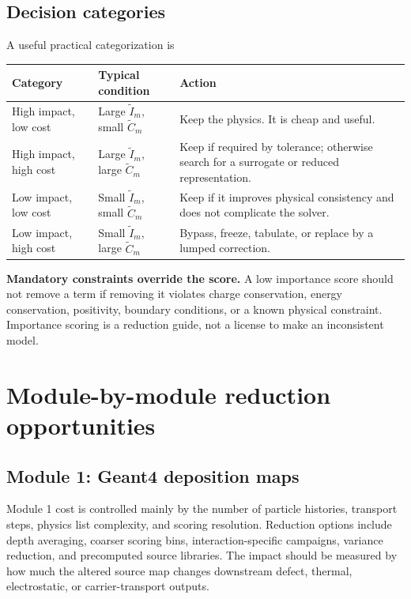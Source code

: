 \documentclass[11pt]{article}
\begin{document}
\subsection{Decision categories}
A useful practical categorization is
\begin{center}
\begin{tabularx}{0.95\textwidth}{>{\RaggedRight\arraybackslash}p{}>{\RaggedRight\arraybackslash}p{}>{\RaggedRight\arraybackslash}X}
\toprule
Category & Typical condition & Action \\
\midrule
High impact, low cost & Large \(\widetilde{I}_m\), small \(\widetilde{C}_m\) & Keep the physics. It is cheap and useful. \\
High impact, high cost & Large \(\widetilde{I}_m\), large \(\widetilde{C}_m\) & Keep if required by tolerance; otherwise search for a surrogate or reduced representation. \\
Low impact, low cost & Small \(\widetilde{I}_m\), small \(\widetilde{C}_m\) & Keep if it improves physical consistency and does not complicate the solver. \\
Low impact, high cost & Small \(\widetilde{I}_m\), large \(\widetilde{C}_m\) & Bypass, freeze, tabulate, or replace by a lumped correction. \\
\bottomrule
\end{tabularx}
\end{center}

\begin{notebox}
\textbf{Mandatory constraints override the score.} A low importance score should not remove a term if removing it violates charge conservation, energy conservation, positivity, boundary conditions, or a known physical constraint. Importance scoring is a reduction guide, not a license to make an inconsistent model.
\end{notebox}

\section{Module-by-module reduction opportunities}
\subsection{Module 1: Geant4 deposition maps}
Module 1 cost is controlled mainly by the number of particle histories, transport steps, physics list complexity, and scoring resolution. Reduction options include depth averaging, coarser scoring bins, interaction-specific campaigns, variance reduction, and precomputed source libraries. The impact should be measured by how much the altered source map changes downstream defect, thermal, electrostatic, or carrier-transport outputs.
\end{document}
